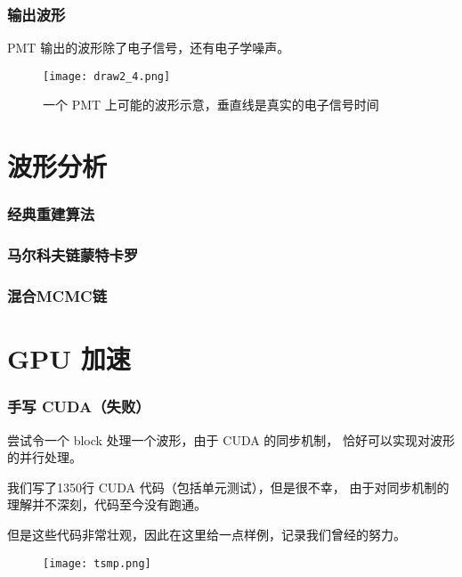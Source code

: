 \documentclass[aspectratio=149]{beamer}
\begin{document}
\begin{frame}
    \frametitle{输出波形}

    PMT 输出的波形除了电子信号，还有电子学噪声。

    \begin{figure}
        \centering
        \texttt{[image: draw2\_4.png]}
        \caption{一个 PMT 上可能的波形示意，垂直线是真实的电子信号时间}
    \end{figure}

\end{frame}
\section{波形分析}
\begin{frame}
    \frametitle{经典重建算法}



\end{frame}

\begin{frame}
    \frametitle{马尔科夫链蒙特卡罗}



\end{frame}

\begin{frame}
    \frametitle{混合MCMC链}



\end{frame}
\section{GPU 加速}
\begin{frame}
    \frametitle{手写 CUDA（失败）}

    \begin{multicols}{2}
        尝试令一个 block 处理一个波形，由于 CUDA 的同步机制，
        恰好可以实现对波形的并行处理。

        我们写了1350行 CUDA 代码（包括单元测试），但是很不幸，
        由于对同步机制的理解并不深刻，代码至今没有跑通。

        但是这些代码非常壮观，因此在这里给一点样例，记录我们曾经的努力。
        \columnbreak
        \begin{figure}
            \texttt{[image: tsmp.png]}
        \end{figure}
    \end{multicols}

\end{frame}
\end{document}
